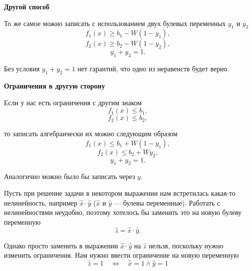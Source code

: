 \bigskip

\textbf{Другой способ}

То же самое можно записать с использованием двух булевых переменных $y_1$ и $y_2$
\[f_1(x) \ge b_1 - W(1-y_1),\]
\[f_2(x) \ge b_2 - W(1-y_2),\]
\[y_1+y_2 = 1.\]

Без условия $y_1 + y_2 = 1$ нет гарантий, что одно из неравенств будет верно.

\bigskip

\textbf{Ограничения в другую сторону}

Если у нас есть ограничения с другим знаком
\[f_1(x) \le b_1,\]
\[f_2(x) \le b_2,\]

то записать алгебраически их можно следующим образом
\[f_1(x) \le b_1 + W(1-y_1),\]
\[f_2(x) \le b_2 + Wy_2,\]
\[y_1 + y_2 = 1.\]

Аналогично можно было бы записать через $y$.

\label{fact:substituion_of_nonlinear}

Пусть при решение задачи в некотором выражении нам встретилась какая-то нелинейность, например $\hat{x} \cdot \hat{y}$ ($\hat{x}$ и $\hat{y}$ --- булевы переменные). Работать с нелинейностями неудобно, поэтому хотелось бы заменить это на новую булеву переменную
\[
	\hat{z} = \hat{x} \cdot \hat{y}.
\]

Однако просто заменить в выражении $\hat{x} \cdot \hat{y}$ на $\hat{z}$ нельзя, поскольку нужно изменить ограничения. Нам нужно ввести ограничение на новую переменную
\[
	\hat{z} = 1 \quad \Longleftrightarrow \quad \hat{x} = 1 \land \hat{y} = 1
\]

